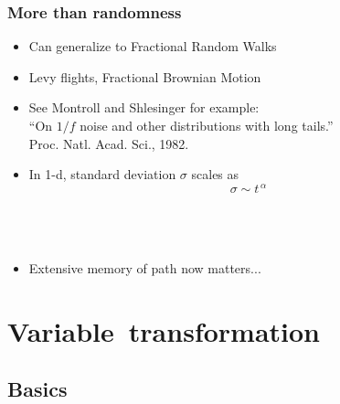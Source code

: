 \begin{frame}
  \frametitle{More than randomness}
  
  \begin{block}{}
    \begin{itemize}
    \item<+->
      Can generalize to Fractional Random Walks\cite{montroll1982a,montroll1983a,montroll1984a}
    \item<+-> 
      Levy flights, Fractional Brownian Motion
    \item<+->
      See Montroll and Shlesinger for example:\cite{montroll1984a}\\
      ``On $1/f$ noise and other distributions with long tails.''\\
      Proc. Natl. Acad. Sci., 1982.
    \item<3-> 
      In 1-d, standard deviation $\sigma$ scales as
      $$
      \sigma \sim t^{\, \alpha}
      $$
      \\
      \\
      \\
    \item<5-> Extensive memory of path now matters...
    \end{itemize}
  \end{block}

\end{frame}  


%


\section{Variable\ transformation}

\subsection{Basics}


